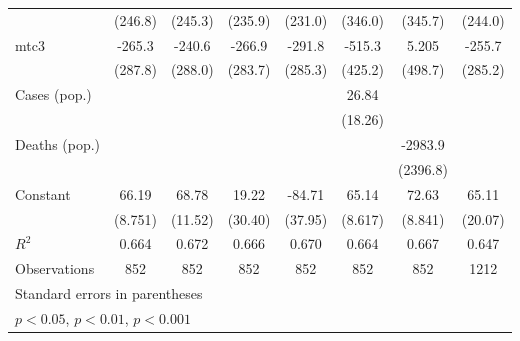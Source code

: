 \documentclass{article}
\begin{document}
{\begin{longtable}{l*{7}{c}}
                &  (246.8)         &  (245.3)         &  (235.9)         &  (231.0)         &  (346.0)         &  (345.7)         &  (244.0)         \\
mtc3            &   -265.3         &   -240.6         &   -266.9         &   -291.8         &   -515.3         &    5.205         &   -255.7         \\
                &  (287.8)         &  (288.0)         &  (283.7)         &  (285.3)         &  (425.2)         &  (498.7)         &  (285.2)         \\
Cases (pop.)    &                  &                  &                  &                  &    26.84         &                  &                  \\
                &                  &                  &                  &                  &  (18.26)         &                  &                  \\
Deaths (pop.)   &                  &                  &                  &                  &                  &  -2983.9         &                  \\
                &                  &                  &                  &                  &                  & (2396.8)         &                  \\
Constant        &    66.19\sym{***}&    68.78\sym{**} &    19.22         &   -84.71         &    65.14\sym{***}&    72.63\sym{***}&    65.11\sym{*}  \\
                &  (8.751)         &  (11.52)         &  (30.40)         &  (37.95)         &  (8.617)         &  (8.841)         &  (20.07)         \\
\hline
\(R^{2}\)       &    0.664         &    0.672         &    0.666         &    0.670         &    0.664         &    0.667         &    0.647         \\
Observations    &      852         &      852         &      852         &      852         &      852         &      852         &     1212         \\
\hline\hline
\multicolumn{8}{l}{\footnotesize Standard errors in parentheses}\\
\multicolumn{8}{l}{\footnotesize \sym{*} \(p<0.05\), \sym{**} \(p<0.01\), \sym{***} \(p<0.001\)}\\
\end{longtable}
}
\end{document}
